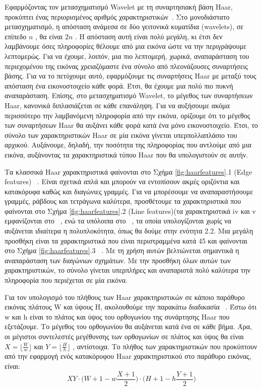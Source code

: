 Εφαρμόζοντας τον μετασχηματισμό Wavelet με τη συναρτησιακή βάση Haar, προκύπτει
ένας περιορισμένος αριθμός χαρακτηριστικών~\cite{OrePapSinOsu97}. Στο μονοδιάστατο μετασχηματισμό, η
απόσταση ανάμεσα σε δύο γειτονικά κυματίδια (wavelets), σε επίπεδο $n$ , θα είναι $2 n$ . Η απόσταση αυτή είναι
πολύ μεγάλη, κι έτσι δεν λαμβάνουμε όσες πληροφορίες θέλουμε από μια εικόνα ώστε να την
περιγράψουμε λεπτομερώς. Για να έχουμε, λοιπόν, μια πιο λεπτομερή, χωρικά, αναπαράσταση του
περιεχομένου της εικόνας χρειαζόμαστε ένα σύνολο από πλεονάζουσες συναρτήσεις βάσης. Για να
το πετύχουμε αυτό, εφαρμόζουμε τις συναρτήσεις Haar με μεταξύ τους απόσταση ένα
εικονοστοιχείο κάθε φορά. Έτσι, θα έχουμε μια πολύ πιο πυκνή αναπαράσταση. Επίσης, στο
μετασχηματισμό Wavelet, το μέγεθος των συναρτήσεων Haar, κανονικά διπλασιάζεται σε κάθε
επανάληψη. Για να αυξήσουμε ακόμα περισσότερο την λαμβανόμενη πληροφορία από την εικόνα,
ορίζουμε ότι το μέγεθος των συναρτήσεων Haar θα αυξάνει κάθε φορά κατά ένα μόνο
εικονοστοιχείο. Έτσι, το σύνολο των χαρακτηριστικών Haar σε μία εικόνα γίνεται
υπερπολλαπλάσιο του αρχικού. Αυξάνουμε, δηλαδή, την ποσότητα της πληροφορίας που αντλούμε
από μια εικόνα, αυξάνοντας τα χαρακτηριστικά τύπου Haar που θα υπολογιστούν σε αυτήν.

Τα κλασσικά Haar χαρακτηριστικά φαίνονται στο Σχήμα \ref{fig:haarfeatures}.1 (Edge features) ~\cite{OrePapSinOsu97}.
Είναι σχετικά απλά και μπορούν να εντοπίσουν ακμές οριζόντια και κατακόρυφα καθώς και διαγώνιες γραμμές. Για να
μπορέσουμε να αναπαραστήσουμε γραμμές, ράβδους και τετράγωνα καλύτερα, προσθέτουμε τα
χαρακτηριστικά που φαίνονται στο Σχήμα \ref{fig:haarfeatures}.2 (Line features)(τα χαρακτηριστικά iv και v εμφανίζονται στο
~\cite{Viola01rapidobject}, ενώ τα υπόλοιπα στο ~\cite{Lienhart02anextended},
τα οποία υπολογίζονται χωρίς να αυξάνεται ιδιαίτερα η
πολυπλοκότητα, όπως θα δούμε στην ενότητα 2.2. Μια μεγάλη προσθήκη είναι τα χαρακτηριστικά
που είναι περιστραμμένα κατά 45 \degree και φαίνονται στο Σχήμα \ref{fig:haarfeatures}.3 ~\cite{Lienhart02anextended}. Με τη χρήση αυτών
βελτιώνεται σημαντικά η αναπαράσταση των διαγώνιων σχημάτων. Με την προσθήκη όλων αυτών
των χαρακτηριστικών, το σύνολο γίνεται υπερπλήρες και αναπαριστά πολύ καλύτερα την
πληροφορία που περιέχεται σε μία εικόνα.

Για τον υπολογισμό του πλήθους των Haar χαρακτηριστικών σε κάποιο παράθυρο εικόνας
πλάτους W και ύψους H, ακολουθούμε την παρακάτω διαδικασία ~\cite{Lienhart02anextended}. Έστω ότι w και h
είναι το πλάτος και ύψος του ορθογωνίου της συνάρτησης Haar που εξετάζουμε. Το μέγεθος του
ορθογωνίου θα αυξάνεται κατά ένα σε κάθε βήμα. Άρα, οι μέγιστοι συντελεστές μεγέθυνσης των
ορθογωνίων σε πλάτος και ύψος θα είναι $X = \lfloor \frac{W}{w} \rfloor $ και $Y = \lfloor \frac{H}{h} \rfloor$ , αντίστοιχα. Το πλήθος των
χαρακτηριστικών που προκύπτουν από την εφαρμογή ενός κατακόρυφου Haar χαρακτηριστικού
στο παράθυρο εικόνας, είναι:
$$
XY \cdot \Bigg(W+1-w \frac{X+1}{2} \Bigg) \cdot \Bigg(H+1-h \frac{Y+1}{2} \Bigg)
$$

